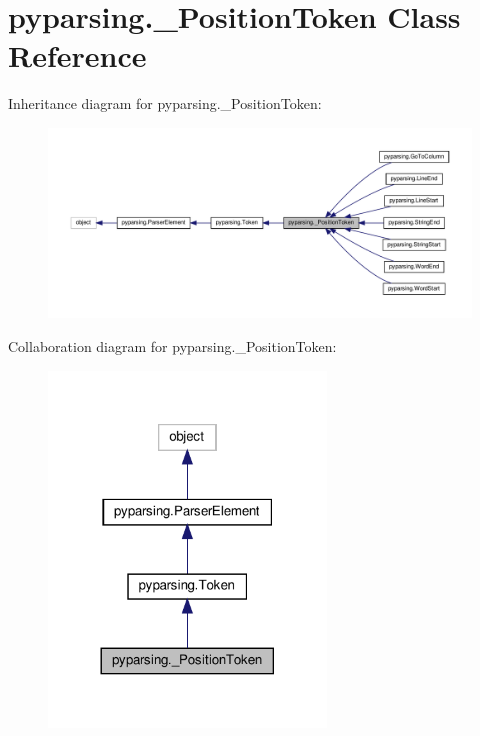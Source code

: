 \hypertarget{classpyparsing_1_1__PositionToken}{}\section{pyparsing.\+\_\+\+Position\+Token Class Reference}
\label{classpyparsing_1_1__PositionToken}


Inheritance diagram for pyparsing.\+\_\+\+Position\+Token\+:
\nopagebreak
\begin{figure}[H]
\begin{center}
\leavevmode
\includegraphics[width=350pt]{classpyparsing_1_1__PositionToken__inherit__graph}
\end{center}
\end{figure}


Collaboration diagram for pyparsing.\+\_\+\+Position\+Token\+:
\nopagebreak
\begin{figure}[H]
\begin{center}
\leavevmode
\includegraphics[width=209pt]{classpyparsing_1_1__PositionToken__coll__graph}
\end{center}
\end{figure}
